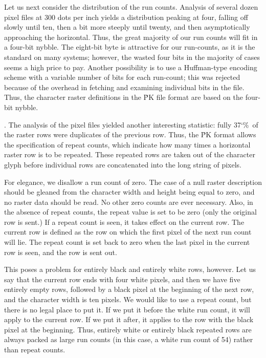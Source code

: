 Let us next consider the distribution of the run counts.  Analysis of several
dozen pixel files at 300 dots per inch yields a distribution peaking at four,
falling off slowly until ten, then a bit more steeply until twenty, and then
asymptotically approaching the horizontal.  Thus, the great majority of our
run counts will fit in a four-bit nybble.  The eight-bit byte is attractive for
our run-counts, as it is the standard on many systems; however, the wasted four
bits in the majority of cases seems a high price to pay.  Another possibility
is to use a Huffman-type encoding scheme with a variable number of bits for
each run-count; this was rejected because of the overhead in fetching and
examining individual bits in the file.  Thus, the character raster definitions
in the \.{PK} file format are based on the four-bit nybble.

\fi

. The analysis of the pixel files yielded another interesting statistic:
fully
37\char`\%\
of the raster rows were duplicates of the previous row.  Thus, the \.{PK}
format allows the specification of repeat counts, which indicate how many times
a horizontal raster row is to be repeated.  These repeated rows are taken out
of the character glyph before individual rows are concatenated into the long
string of pixels.

For elegance, we disallow a run count of zero.  The case of a null raster
description should be gleaned from the character width and height being equal
to zero, and no raster data should be read.  No other zero counts are ever
necessary.  Also, in the absence of repeat counts, the repeat value is set to
be zero (only the original row is sent.)  If a repeat count is seen, it takes
effect on the current row.  The current row is defined as the row on which the
first pixel of the next run count will lie.  The repeat count is set back to
zero when the last pixel in the current row is seen, and the row is sent out.

This poses a problem for entirely black and entirely white rows, however.  Let
us say that the current row ends with four white pixels, and then we have five
entirely empty rows, followed by a black pixel at the beginning of the next
row, and the character width is ten pixels.  We would like to use a repeat
count, but there is no legal place to put it.  If we put it before the white
run count, it will apply to the current row.  If we put it after, it applies
to the row with the black pixel at the beginning.  Thus, entirely white or
entirely black repeated rows are always packed as large run counts (in this
case, a white run count of 54) rather than repeat counts.

